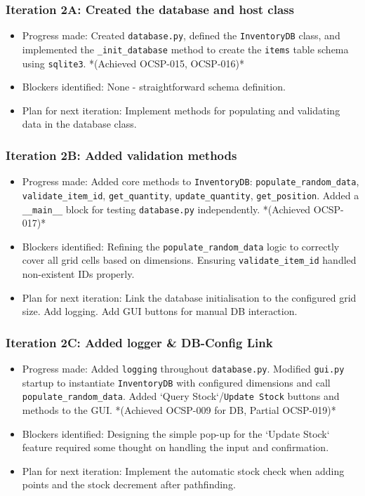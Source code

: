 \subsubsection{Iteration 2A: Created the database and host class}
\begin{itemize}
	\item Progress made: Created \verb|database.py|, defined the \verb|InventoryDB| class, and implemented the \verb|_init_database| method to create the \verb|items| table schema using \verb|sqlite3|. *(Achieved OCSP-015, OCSP-016)*
	\item Blockers identified: None - straightforward schema definition.
	\item Plan for next iteration: Implement methods for populating and validating data in the database class.
\end{itemize}

\subsubsection{Iteration 2B: Added validation methods}
\begin{itemize}
	\item Progress made: Added core methods to \verb|InventoryDB|: \verb|populate_random_data|, \verb|validate_item_id|, \verb|get_quantity|, \verb|update_quantity|, \verb|get_position|. Added a \verb|__main__| block for testing \verb|database.py| independently. *(Achieved OCSP-017)*
	\item Blockers identified: Refining the \verb|populate_random_data| logic to correctly cover all grid cells based on dimensions. Ensuring \verb|validate_item_id| handled non-existent IDs properly.
	\item Plan for next iteration: Link the database initialisation to the configured grid size. Add logging. Add GUI buttons for manual DB interaction.
\end{itemize}

\subsubsection{Iteration 2C: Added logger \& DB-Config Link}
\begin{itemize}
	\item Progress made: Added \verb|logging| throughout \verb|database.py|. Modified \verb|gui.py| startup to instantiate \verb|InventoryDB| with configured dimensions and call \verb|populate_random_data|. Added `Query Stock`/\verb|Update Stock| buttons and methods to the GUI. *(Achieved OCSP-009 for DB, Partial OCSP-019)*
	\item Blockers identified: Designing the simple pop-up for the `Update Stock` feature required some thought on handling the input and confirmation.
	\item Plan for next iteration: Implement the automatic stock check when adding points and the stock decrement after pathfinding.
\end{itemize}

